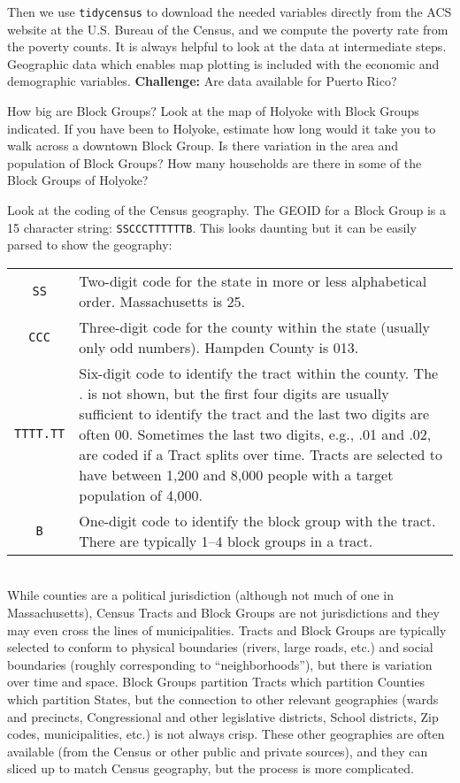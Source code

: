 \documentclass[fleqn, 12pt]{exam}
\begin{document}
\begin{questions}
  \question Then we use \texttt{tidycensus} to download the needed variables directly from the ACS website at the U.S. Bureau of the Census, and we compute the poverty rate from the poverty counts. It is always helpful to look at the data at intermediate steps.  Geographic data which enables map plotting is included with the economic and demographic variables.  \textbf{Challenge:} Are data available for Puerto Rico?

  \question How big are Block Groups?  Look at the map of Holyoke with Block Groups indicated.  If you have been to Holyoke, estimate how long would it take you to walk across a downtown Block Group.  Is there variation in the area and population of Block Groups?  How many households are there in some of the Block Groups of Holyoke?
    
  \question Look at the coding of the Census geography. The GEOID for a Block Group is a 15 character string:  \texttt{SSCCCTTTTTTB}. This looks daunting but it can be easily parsed to show the geography:\\
    \begin{tabular}{cp{}}
      \texttt{SS}  & Two-digit code for the state in more or less alphabetical order. Massachusetts is 25. \\
      \texttt{CCC} & Three-digit code for the county within the state (usually only odd numbers).  Hampden County is 013. \\
      \texttt{TTTT.TT} & Six-digit code to identify the tract within the county.  The . is not shown, but the first four digits are usually sufficient to identify the tract and the last two digits are often 00. Sometimes the last two digits, e.g., .01 and .02, are coded if a Tract splits over time. Tracts are selected to have between 1,200 and 8,000 people with a target population of 4,000.\\
      \texttt{B} & One-digit code to identify the block group with the tract. There are typically 1--4 block groups in a tract.
    \end{tabular}\\
    While counties are a political jurisdiction (although not much of one in Massachusetts), Census Tracts and Block Groups are not jurisdictions and they may even cross the lines of municipalities.  Tracts and Block Groups are typically selected to conform to physical boundaries (rivers, large roads, etc.) and social boundaries (roughly corresponding to ``neighborhoods''), but there is variation over time and space.  Block Groups partition Tracts which partition Counties which partition States, but the connection to other relevant geographies (wards and precincts, Congressional and other legislative districts, School districts, Zip codes, municipalities, etc.) is not always crisp.  These other geographies are often available (from the Census or other public and private sources), and they can sliced up to match Census geography, but the process is more complicated.
    

\end{questions}
\end{document}
